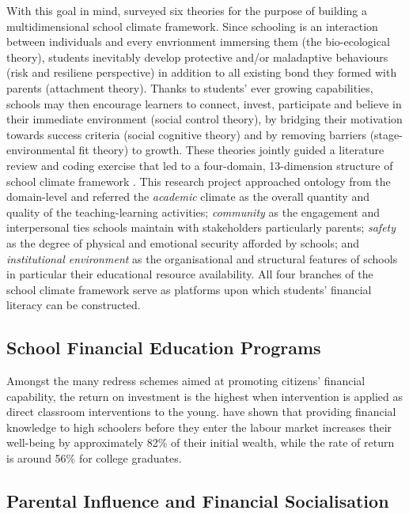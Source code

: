 \documentclass[a4paper,11pt,UKenglish,twoside,openright]{report}\usepackage[]{graphicx}\usepackage[]{color}
\begin{document}
With this goal in mind, \textcite{wang:2016} surveyed six theories for the purpose of building a multidimensional school climate framework. Since schooling is an interaction between individuals and every envrionment immersing them (the bio-ecological theory), students inevitably develop protective and/or maladaptive behaviours (risk and resiliene perspective) in addition to all existing bond they formed with parents (attachment theory). Thanks to students' ever growing capabilities, schools may then encourage learners to connect, invest, participate and believe in their immediate environment (social control theory), by bridging their motivation towards success criteria (social cognitive theory) and by removing barriers (stage-environmental fit theory) to growth. These theories jointly guided a literature review and coding exercise that led to a four-domain, 13-dimension structure of school climate framework \parencite[see Figure 1,][p. 318]{wang:2016}. This research project approached  ontology from the domain-level and referred the \emph{academic} climate as the overall quantity and quality of the teaching-learning activities; \emph{community} as the engagement and interpersonal ties schools maintain with stakeholders particularly parents; \emph{safety} as the degree of physical and emotional security afforded by schools; and \emph{institutional environment} as the organisational and structural features of schools in particular their educational resource availability. All four branches of the school climate framework serve as platforms upon which students' financial literacy can be constructed.

\subsection{School Financial Education Programs}

Amongst the many redress schemes aimed at promoting citizens' financial capability, the return on investment is the highest when intervention is applied as direct classroom interventions to the young. \textcite{lusardi:2014} have shown that providing financial knowledge to high schoolers before they enter the labour market increases their well-being by approximately 82\% of their initial wealth, while the rate of return is around 56\% for college graduates.

\subsection{Parental Influence and Financial Socialisation}
\end{document}
